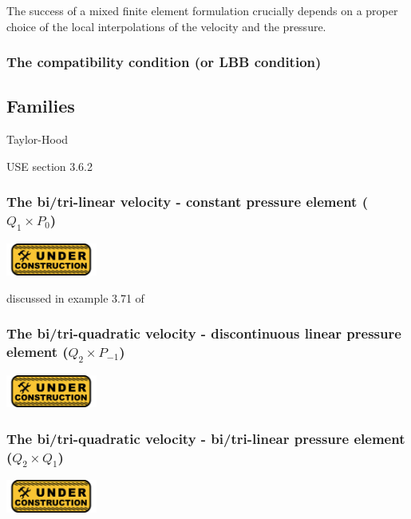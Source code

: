 

The success of a mixed finite element formulation crucially depends on a proper choice of the local interpolations of the velocity and the pressure. 

\subsubsection{The compatibility condition (or LBB condition)}


\subsection{Families}

Taylor-Hood

USE \cite{john16} section 3.6.2




\subsubsection{The bi/tri-linear velocity - constant pressure element ($Q_1\times P_0$)}
\includegraphics[width=3cm]{images/under_construction}

discussed in example 3.71 of \cite{john16}

\subsubsection{The bi/tri-quadratic velocity - discontinuous linear pressure element ($Q_2 \times P_{-1}$)}
\includegraphics[width=3cm]{images/under_construction}

\subsubsection{The bi/tri-quadratic velocity - bi/tri-linear pressure element ($Q_2 \times Q_1$)}
\includegraphics[width=3cm]{images/under_construction}


